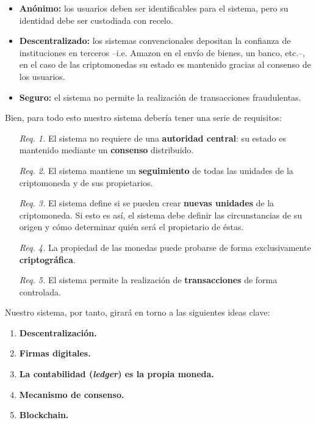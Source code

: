 \documentclass[10pt, a4paper]{article}
\theoremstyle{theorem-style}
\theoremstyle{theorem-style}
\theoremstyle{definition-style}
\theoremstyle{remark-style}
\theoremstyle{example-style}
\theoremstyle{definition-style}
\theoremstyle{remark-style}
\begin{document}
\begin{itemize}
\itemsep1pt\parskip0pt
\item
  \textbf{Anónimo:} los usuarios deben ser identificables para el sistema, pero
  su identidad debe ser custodiada con recelo.
\item
  \textbf{Descentralizado:} los sistemas convencionales depositan la confianza de
  instituciones en terceros --i.e. Amazon en el envío de bienes, un banco, etc.--,
  en el caso de las criptomonedas su estado es mantenido gracias al consenso de
  los usuarios.
\item
  \textbf{Seguro:} el sistema no permite la realización de transacciones fraudulentas.
\end{itemize}

Bien, para todo esto nuestro sistema debería tener una serie de
requisitos:

\begin{enumerate}
\def\labelenumi{\arabic{enumi}.}
\itemsep1pt\parskip0pt
\item[\emph{Req. 1.}]
  El sistema no requiere de una \textbf{autoridad central}: su estado es
  mantenido mediante un \textbf{consenso} distribuido.
\item[\emph{Req. 2.}]
  El sistema mantiene un \textbf{seguimiento} de todas las unidades de
  la criptomoneda y de sus propietarios.
\item[\emph{Req. 3.}]
  El sistema define si se pueden crear \textbf{nuevas unidades} de la
  criptomoneda. Si esto es así, el sistema debe definir las
  circunstancias de su origen y cómo determinar quién será el
  propietario de éstas.
\item[\emph{Req. 4.}]
  La propiedad de las monedas puede probarse de forma exclusivamente
  \textbf{criptográfica}.
\item[\emph{Req. 5.}]
  El sistema permite la realización de \textbf{transacciones} de forma
  controlada.
\end{enumerate}

Nuestro sistema, por tanto, girará en torno a las siguientes ideas clave:

\begin{enumerate}
\itemsep1pt\parskip0pt
\item
  \textbf{Descentralización.}
\item
  \textbf{Firmas digitales.}
\item
  \textbf{La contabilidad (\emph{ledger}) es la propia moneda.}
\item
  \textbf{Mecanismo de consenso.}
\item
  \textbf{Blockchain.}
\end{enumerate}
\end{document}

